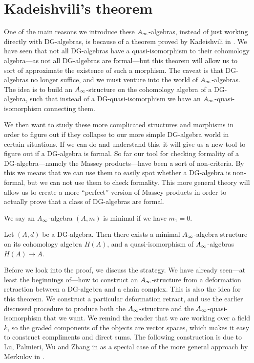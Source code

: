 

\section{Kadeishvili's theorem}

One of the main reasons we introduce these $A_{\infty}$-algebras, instead of just working directly with DG-algebras, is because of a theorem proved by Kadeishvili in \cite{kadeishvili}. We have seen that not all DG-algebras have a quasi-isomorphism to their cohomology algebra---as not all DG-algebras are formal---but this theorem will allow us to sort of approximate the existence of such a morphism. The caveat is that DG-algebras no longer suffice, and we must venture into the world of $A_{\infty}$-algebras. The idea is to build an $A_{\infty}$-structure on the cohomology algebra of a DG-algebra, such that instead of a DG-quasi-isomorphism we have an $A_{\infty}$-quasi-isomorphism connecting them. 

We then want to study these more complicated structures and morphisms in order to figure out if they collapse to our more simple DG-algebra world in certain situations. If we can do and understand this, it will give us a new tool to figure out if a DG-algebra is formal. So far our tool for checking formality of a DG-algebra---namely the Massey products---have been a sort of non-criteria. By this we means that we can use them to easily spot whether a DG-algebra is non-formal, but we can not use them to check formality. This more general theory will allow us to create a more ``perfect'' version of Massey products in order to actually prove that a class of DG-algebras are formal. 

\begin{definition}
\label{def:minimal_A_infinity-algebra}
We say an $A_{\infty}$-algebra $(A, m)$ is minimal if we have $m_1 = 0$. 
\end{definition}

\begin{theorem}
\label{thm:Kadeishvilis_theorem}
Let $(A,d)$ be a DG-algebra. Then there exists a minimal $A_{\infty}$-algebra structure on its cohomology algebra $H(A)$, and a quasi-isomorphism of $A_{\infty}$-algebras $H(A)\rightarrow A$. 
\end{theorem}

Before we look into the proof, we discuss the strategy. We have already seen---at least the beginnings of---how to construct an $A_{\infty}$-structure from a deformation retraction between a DG-algebra and a chain complex. This is also the idea for this theorem. We construct a particular deformation retract, and use the earlier discussed procedure to produce both the $A_{\infty}$-structure and the $A_{\infty}$-quasi-isomorphism that we want. We remind the reader that we are working over a field $k$, so the graded components of the objects are vector spaces, which makes it easy to construct compliments and direct sums. The following construction is due to Lu, Palmieri, Wu and Zhang in \cite{Ext} as a special case of the more general approach by Merkulov in \cite{Merkulov}. 

